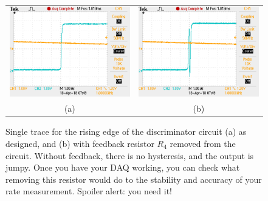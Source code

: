 \documentclass[12pt]{article}
\begin{document}
\begin{figure}[thbp]
\begin{center}
\begin{tabular}{cc}
{\includegraphics[height=0.25\textheight]{figs/schmitty.pdf}} &
{\includegraphics[height=0.25\textheight]{figs/bouncy.pdf}} \\
(a) & (b) \\
\end{tabular}
\caption{\label{fig:bounce} Single trace for the rising edge of the discriminator circuit (a) as designed, and (b) with feedback resistor $R_4$ removed from the circuit.  Without feedback, there is no hysteresis, and the output is jumpy.  Once you have your DAQ working, you can check what removing this resistor would do to the stability and accuracy of your rate measurement.  Spoiler alert:  you need it!}
\end{center}
\end{figure}
\end{document}
